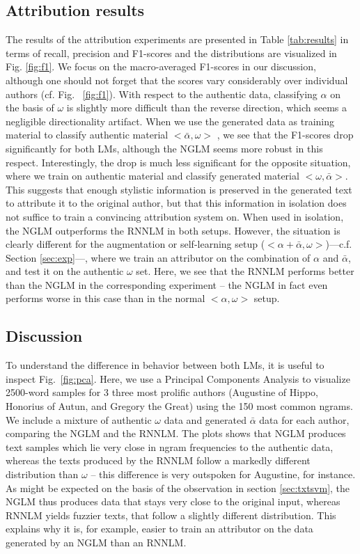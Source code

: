 \documentclass[11pt]{article}
\begin{document}
\subsection{Attribution results}
The results of the attribution experiments are presented in Table \ref{tab:results} in terms of recall, precision and F1-scores and the distributions are visualized in Fig. \ref{fig:f1}. We focus on the macro-averaged F1-scores in our discussion, although one should not forget that the scores vary considerably over individual authors (cf. Fig. ~\ref{fig:f1}). With respect to the authentic data, classifying $\alpha$ on the basis of $\omega$ is slightly more difficult than the reverse direction, which seems a negligible directionality artifact. When we use the generated data as training material to classify authentic material $<\bar{\alpha},\omega>$ , we see that the F1-scores drop significantly for both LMs, although the NGLM seems more robust in this respect. Interestingly, the drop is much less significant for the opposite situation, where we train on authentic material and classify generated material $<\omega, \bar{\alpha}>$. This suggests that enough stylistic information is preserved in the generated text to attribute it to the original author, but that this information in isolation does not suffice to train a convincing attribution system on. When used in isolation, the NGLM outperforms the RNNLM in both setups. However, the situation is clearly different for the augmentation or self-learning setup ($<\alpha+\bar{\alpha},\omega>$)---c.f. Section \ref{sec:exp}---, where we train an attributor on the combination of $\alpha$ and $\bar{\alpha}$, and test it on the authentic $\omega$ set. Here, we see that the RNNLM performs better than the NGLM in the corresponding experiment -- the NGLM in fact even performs worse in this case than in the normal $<\alpha,\omega>$ setup.

\subsection{Discussion}
To understand the difference in behavior between both LMs, it is useful to inspect Fig.~\ref{fig:pca}. Here, we use a Principal Components Analysis  \cite{binongo1999} to visualize 2500-word samples for 3 three most prolific authors (Augustine of Hippo, Honorius of Autun, and Gregory the Great) using the 150 most common ngrams. We include a mixture of authentic $\omega$ data and generated $\bar{\alpha}$ data for each author, comparing the NGLM and the RNNLM. The plots shows that NGLM produces text samples which lie very close in ngram frequencies to the authentic data, whereas the texts produced by the RNNLM follow a markedly different distribution than $\omega$ -- this difference is very outspoken for Augustine, for instance. As might be expected on the basis of the observation in section \ref{sec:txtsvm}, the NGLM thus produces data that stays very close to the original input, whereas RNNLM yields fuzzier texts, that follow a slightly different distribution. This explains why it is, for example, easier to train an attributor on the data generated by an NGLM than an RNNLM.
\end{document}
